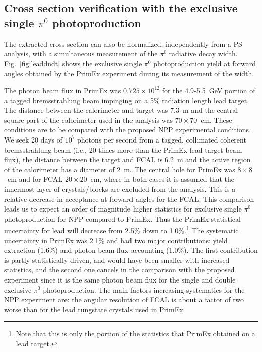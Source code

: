 \subsection{Cross section verification with the exclusive single $\pi^{0}$ photoproduction  \label{sec:pi0norm} }
The extracted cross section can also be normalized, independently
from a PS analysis, with a simultaneous measurement of the $\pi^0$ radiative decay width.  Fig.~\ref{fig:leaddndt} shows the exclusive single $\pi^0$
photoproduction yield at forward angles obtained by the PrimEx
experiment during its measurement of the width.

The photon beam flux in PrimEx was $0.725\times10^{12}$ for
the 4.9-5.5~GeV portion of a tagged bremsstrahlung beam impinging on
a 5\% radiation length lead
target. The distance between the calorimeter and target was 7.3~m
and the central square part of the calorimeter used in the analysis was
$70\times70$~cm. These conditions are to be compared with the
proposed NPP experimental conditions. We seek 20 days of $10^7$ photons per second from a tagged, collimated coherent bremsstrahlung beam
(i.e., 20 times more than the PrimEx lead target beam flux), the
distance between the target and FCAL is 6.2~m and the active region of
the calorimeter has a diameter of 2~m.
The central hole for
PrimEx was $8\times8$~cm and for FCAL $20\times20$~cm, where
in both cases it is assumed that the innermost layer of crystals/blocks
are excluded from the analysis. This is a relative decrease in
acceptance at forward angles for the FCAL.
This comparison leads us to expect an order of
magnitude higher statistics for exclusive single
$\pi^0$ photoproduction for NPP compared to PrimEx.
Thus the PrimEx statistical uncertainty for lead will decrease from
2.5\% down to 1.0\%.\footnote{Note that this is only
the portion of the statistics that PrimEx
obtained on a lead target.} The systematic uncertainty
in PrimEx was 2.1\% and had two major contributions: yield
extraction (1.6\%) and photon beam flux accounting
(1.0\%).  The first contribution is partly statistically
driven, and would have been smaller with increased statistics,
and the second one cancels in the comparison with the proposed experiment
since it is the same photon beam flux for the single and double exclusive
$\pi^0$ photoproduction. The main factors increasing
systematics for the NPP experiment are: the angular resolution of FCAL is about a factor of two worse than for
the lead tungstate crystals used in PrimEx
